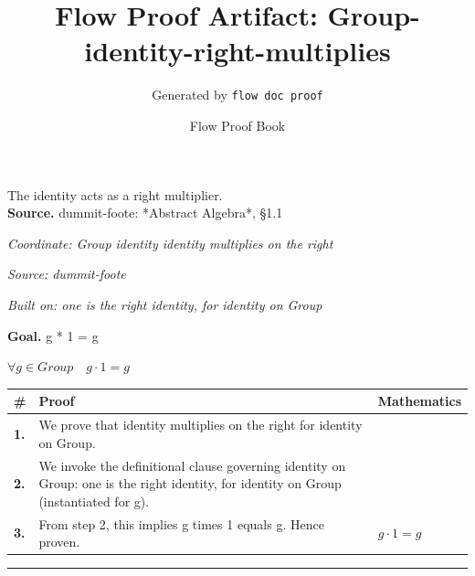\documentclass[11pt]{article}
\title{Flow Proof Artifact: Group-identity-right-multiplies}
\author{Generated by \texttt{flow doc proof}}
\date{Flow Proof Book}
\theoremstyle{definition}
\begin{document}
\maketitle
The identity acts as a right multiplier.\\[0.5em]
\textbf{Source.} dummit-foote: *Abstract Algebra*, §1.1\\[0.5em]
\bigskip
{}\par
\smallskip\noindent\textit{Coordinate: Group \cdot identity \cdot identity multiplies on the right}\par
\smallskip\noindent\textit{Source: dummit-foote}\par
\smallskip\noindent\textit{Built on: one is the right identity, for identity on Group}\par
\medskip
\noindent\textbf{Goal.} g * 1 = g\par
\noindent$\displaystyle \forall g \in Group\quad g \cdot 1 = g$\par
\medskip
\noindent
\begin{tabular}{@{} >{\raggedright\arraybackslash}p{} >{\raggedright\arraybackslash}p{} >{\raggedleft\arraybackslash}p{} @{}}
\textbf{\#} & \textbf{Proof} & \textbf{Mathematics} \\
\midrule
\textbf{1.} & We prove that identity multiplies on the right for identity on Group. & \\[0.45em]
\textbf{2.} & We invoke the definitional clause governing identity on Group: one is the right identity, for identity on Group (instantiated for g). & \\[0.45em]
\textbf{3.} & From step 2, this implies g times 1 equals g. Hence proven. & $\displaystyle g \cdot 1 = g$ \\[0.45em]
\bottomrule
\end{tabular}
\label{thm:Group-identity-identity_multiplies_on_the_right}
\par\medskip\hrule
\end{document}
